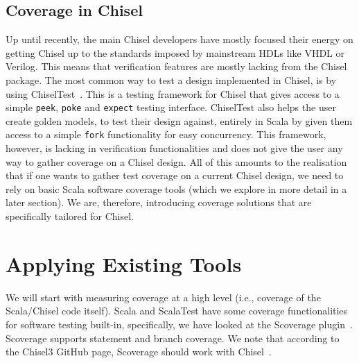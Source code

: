\documentclass[conference]{IEEEtran}
\newcommand{\martin}[1]{{\color{blue} Martin: #1}}
\begin{document}
\subsection{Coverage in Chisel} 
Up until recently, the main Chisel developers have mostly focused their energy on getting Chisel up to the standards imposed by mainstream HDLs like VHDL or Verilog. 
This means that verification features are mostly lacking from the Chisel package. 
The most common way to test a design implemented in Chisel, is by using ChiselTest~\cite{chisel:tester2}. 
This is a testing framework for Chisel that gives access to a simple \texttt{peek}, \texttt{poke} and \texttt{expect} testing interface. 
ChiselTest also helps the user create golden models, to test their design against, entirely in Scala by given them access to a simple \texttt{fork} functionality for easy concurrency.  
This framework, however, is lacking in verification functionalities and does not give the user any way to gather coverage on a Chisel design.
All of this amounts to the realisation that if one wants to gather test coverage on a current Chisel design, we need to rely on basic Scala software coverage tools (which we explore in more detail in a later section). 
We are, therefore, introducing coverage solutions that are specifically tailored for Chisel.

\section{Applying Existing Tools}
We will start with measuring coverage at a high level (i.e., coverage of the Scala/Chisel code itself). Scala and ScalaTest have some coverage functionalities for software testing built-in, specifically, we have looked at the Scoverage plugin~\cite{scoverage}. Scoverage supports statement and branch coverage. We note that according to the Chisel3 GitHub page, Scoverage should work with Chisel~\cite{chisel:scoverage}.

\end{document}

